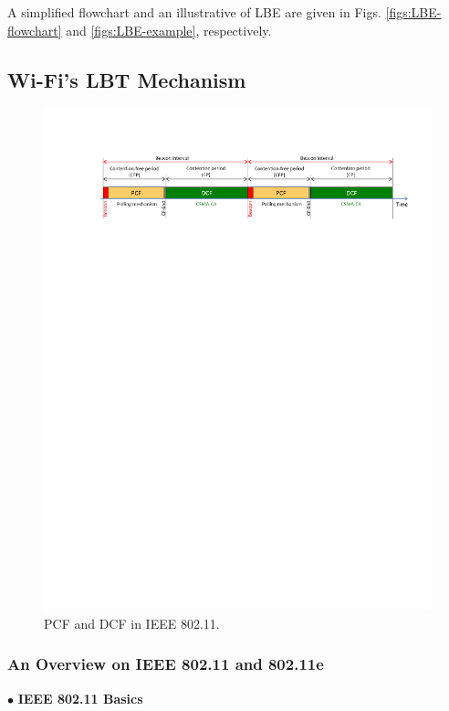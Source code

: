 \documentclass[journal,draftclsnofoot,12pt,onecolumn]{IEEEtran}
\begin{document}
A simplified flowchart and an illustrative of LBE are given in Figs. \ref{figs:LBE-flowchart} and \ref{figs:LBE-example}, respectively.

\subsection{Wi-Fi's LBT Mechanism}

\begin{figure}[!t]
\centering
\includegraphics[width=1.0\columnwidth]{figures2/802-11-PCF-DCF}
\caption{PCF and DCF in IEEE 802.11.}
\label{figs:802-11-PCF-DCF}
\end{figure}

\subsubsection{An Overview on IEEE 802.11 and 802.11e}

\vspace{3mm}
\noindent $\bullet$ \textbf{IEEE 802.11 Basics}
\vspace{3mm}
\end{document}
